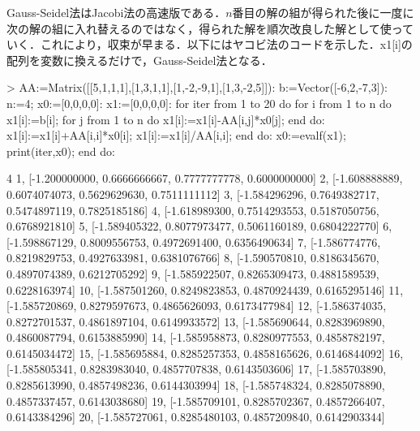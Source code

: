 Gauss-Seidel法はJacobi法の高速版である．$n$番目の解の組が得られた後に一度に次の解の組に入れ替えるのではなく，得られた解を順次改良した解として使っていく．これにより，収束が早まる．以下にはヤコビ法のコードを示した．x1[i]の配列を変数に換えるだけで，Gauss-Seidel法となる．
\begin{MapleInput}
> AA:=Matrix([[5,1,1,1],[1,3,1,1],[1,-2,-9,1],[1,3,-2,5]]):
  b:=Vector([-6,2,-7,3]): n:=4; 
  x0:=[0,0,0,0]: x1:=[0,0,0,0]: 
  for iter from 1 to 20 do
    for i from 1 to n do
      x1[i]:=b[i]; 
      for j from 1 to n do
        x1[i]:=x1[i]-AA[i,j]*x0[j];
      end do:
      x1[i]:=x1[i]+AA[i,i]*x0[i];
      x1[i]:=x1[i]/AA[i,i];
    end do:
    x0:=evalf(x1);
    print(iter,x0);
  end do:
\end{MapleInput}
\begin{MapleError}
                                      4
          1, [-1.200000000, 0.6666666667, 0.7777777778, 0.6000000000]
          2, [-1.608888889, 0.6074074073, 0.5629629630, 0.7511111112]
          3, [-1.584296296, 0.7649382717, 0.5474897119, 0.7825185186]
          4, [-1.618989300, 0.7514293553, 0.5187050756, 0.6768921810]
          5, [-1.589405322, 0.8077973477, 0.5061160189, 0.6804222770]
          6, [-1.598867129, 0.8009556753, 0.4972691400, 0.6356490634]
          7, [-1.586774776, 0.8219829753, 0.4927633981, 0.6381076766]
          8, [-1.590570810, 0.8186345670, 0.4897074389, 0.6212705292]
          9, [-1.585922507, 0.8265309473, 0.4881589539, 0.6228163974]
         10, [-1.587501260, 0.8249823853, 0.4870924439, 0.6165295146]
         11, [-1.585720869, 0.8279597673, 0.4865626093, 0.6173477984]
         12, [-1.586374035, 0.8272701537, 0.4861897104, 0.6149933572]
         13, [-1.585690644, 0.8283969890, 0.4860087794, 0.6153885990]
         14, [-1.585958873, 0.8280977553, 0.4858782197, 0.6145034472]
         15, [-1.585695884, 0.8285257353, 0.4858165626, 0.6146844092]
         16, [-1.585805341, 0.8283983040, 0.4857707838, 0.6143503606]
         17, [-1.585703890, 0.8285613990, 0.4857498236, 0.6144303994]
         18, [-1.585748324, 0.8285078890, 0.4857337457, 0.6143038680]
         19, [-1.585709101, 0.8285702367, 0.4857266407, 0.6143384296]
         20, [-1.585727061, 0.8285480103, 0.4857209840, 0.6142903344]
\end{MapleError}